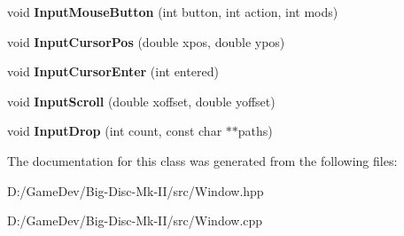 \begin{DoxyCompactItemize}
void {\bfseries Input\+Mouse\+Button} (int button, int action, int mods)
\item 
\mbox{\label{class_window_a45f4c362aa39464500a3e2699378967c}} 
void {\bfseries Input\+Cursor\+Pos} (double xpos, double ypos)
\item 
\mbox{\label{class_window_a6d5def277798a34d48e80be32182f5dc}} 
void {\bfseries Input\+Cursor\+Enter} (int entered)
\item 
\mbox{\label{class_window_a4ab0163a8c9fb24ae8cfaa255ca39e31}} 
void {\bfseries Input\+Scroll} (double xoffset, double yoffset)
\item 
\mbox{\label{class_window_ac0b9d2e31cb1c9916160582d97f970f7}} 
void {\bfseries Input\+Drop} (int count, const char $\ast$$\ast$paths)
\end{DoxyCompactItemize}


The documentation for this class was generated from the following files\+:\begin{DoxyCompactItemize}
\item 
D\+:/\+Game\+Dev/\+Big-\/\+Disc-\/\+Mk-\/\+I\+I/src/Window.\+hpp\item 
D\+:/\+Game\+Dev/\+Big-\/\+Disc-\/\+Mk-\/\+I\+I/src/Window.\+cpp\end{DoxyCompactItemize}
